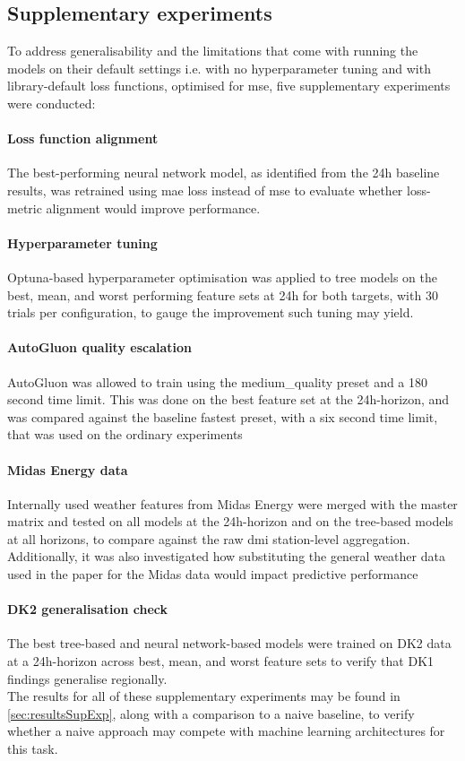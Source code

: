\subsection{Supplementary experiments}\label{sec:expSupExp}
To address generalisability and the limitations that come
with running the models on their default settings i.e. with no
hyperparameter tuning and with library-default loss functions,
optimised for \gls{mse}, five supplementary experiments were conducted:
\paragraph{Loss function alignment} The best-performing neural
network model, as identified from the 24h baseline results, was
retrained using \gls{mae} loss instead of \gls{mse} to evaluate whether
loss-metric alignment would improve performance.
\paragraph{Hyperparameter tuning} Optuna-based 
hyperparameter optimisation 
was applied to tree models on the best, mean, and worst performing feature sets 
at 24h for both targets, with 30 trials per configuration, to gauge the 
improvement such tuning may yield.
\paragraph{AutoGluon quality escalation} AutoGluon was allowed to train using 
the medium\_quality preset and a 180
second time limit. This was done on the best feature set at the
24h-horizon, and was compared against the baseline fastest
preset, with a six second time limit, that was used on the
ordinary experiments
\paragraph{Midas Energy data} Internally used weather features
from Midas Energy were merged with the master matrix
and tested on all models at the 24h-horizon and on the tree-based models at all 
horizons, to compare against the raw \gls{dmi}
station-level aggregation. Additionally, it was also investigated
how substituting the general weather data used in the paper
for the Midas data would impact predictive performance
\paragraph{DK2 generalisation check} The best 
tree-based and
neural network-based models were trained on DK2 data at a
24h-horizon across best, mean, and worst feature sets to verify
that DK1 findings generalise regionally.\\
The results for all of these supplementary experiments may be
found in \autoref{sec:resultsSupExp}, along with a comparison to a naive
baseline, to verify whether a naive approach may compete with
machine learning architectures for this task.
